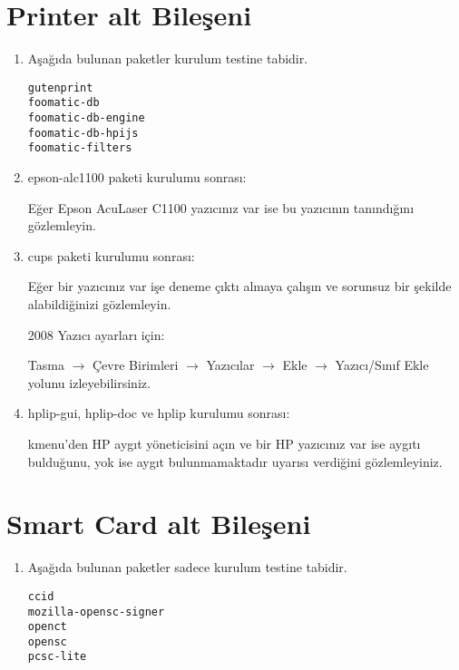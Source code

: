 \documentclass[a4paper,10pt]{article}
\begin{document}
\section{Printer alt Bileşeni}
\begin{enumerate}

\item Aşağıda bulunan paketler kurulum testine tabidir.
\begin{verbatim}
gutenprint 
foomatic-db
foomatic-db-engine
foomatic-db-hpijs
foomatic-filters
\end{verbatim}
\item epson-alc1100 paketi kurulumu sonrası:

Eğer Epson AcuLaser C1100 yazıcınız var ise bu yazıcının tanındığını gözlemleyin.

\item cups paketi kurulumu sonrası:

Eğer bir yazıcınız var işe deneme çıktı almaya çalışın ve sorunsuz bir şekilde alabildiğinizi gözlemleyin.

2008 Yazıcı ayarları için:

Tasma $\rightarrow$ Çevre Birimleri $\rightarrow$ Yazıcılar $\rightarrow$ Ekle $\rightarrow$ Yazıcı/Sınıf Ekle yolunu izleyebilirsiniz.

\item hplip-gui, hplip-doc ve hplip kurulumu sonrası:

kmenu'den HP aygıt yöneticisini açın ve bir HP yazıcınız var ise aygıtı bulduğunu, yok ise aygıt bulunmamaktadır uyarısı verdiğini gözlemleyiniz.
    
\end{enumerate}

\section{Smart Card alt Bileşeni}
\begin{enumerate}
 \item Aşağıda bulunan paketler sadece kurulum testine tabidir.
\begin{verbatim}
ccid 
mozilla-opensc-signer
openct
opensc
pcsc-lite
\end{verbatim}


\end{enumerate}
\end{document}
